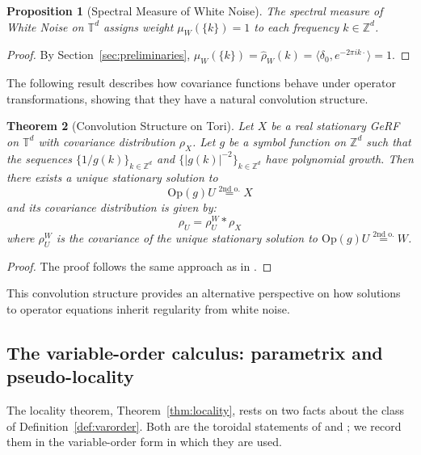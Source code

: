 \documentclass[pdflatex,sn-mathphys,Numbered]{sn-jnl}
\theoremstyle{thmstyleone}%
\newtheorem{theorem}{Theorem}[section]%
\newtheorem{proposition}[theorem]{Proposition}%
\theoremstyle{thmstyletwo}%
\theoremstyle{thmstylethree}%
\newcommand{\ZZ}{\mathbb{Z}}
\newcommand{\TT}{\mathbb{T}}
\newcommand{\Op}{\mathrm{Op}}
\newcommand{\eqso}{\stackrel{\text{2nd o.}}{=}}
\begin{document}
\begin{appendices}
\begin{proposition}[Spectral Measure of White Noise]\label{prop:wn-spectral}
The spectral measure of White Noise on $\TT^d$ assigns weight
$\mu_W(\{k\}) = 1$ to each frequency $k \in \ZZ^d$.
\end{proposition}

\begin{proof}
By Section~\ref{sec:preliminaries}, $\mu_W(\{k\}) = \hat\rho_W(k)
= \langle \delta_0, e^{-2\pi i k\cdot}\rangle = 1$.
\end{proof}

The following result describes how covariance functions behave under operator transformations, showing that they have a natural convolution structure.

\begin{theorem}[Convolution Structure on Tori]
Let $X$ be a real stationary GeRF on $\TT^d$ with covariance distribution $\rho_X$. Let $g$ be a symbol function on $\ZZ^d$ such that the sequences $\{1/g(k)\}_{k \in \ZZ^d}$ and $\{|g(k)|^{-2}\}_{k \in \ZZ^d}$ have polynomial growth. Then there exists a unique stationary solution to
$$\Op(g) U \eqso X$$
and its covariance distribution is given by:
$$\rho_U = \rho_U^W * \rho_X$$
where $\rho_U^W$ is the covariance of the unique stationary solution to $\Op(g) U \eqso W$.
\end{theorem}

\begin{proof}
The proof follows the same approach as in \cite{gerfs}.
\end{proof}

This convolution structure provides an alternative perspective on how solutions to operator equations inherit regularity from white noise.

\subsection{The variable-order calculus: parametrix and pseudo-locality}
\label{subsec:parametrix}

The locality theorem, Theorem~\ref{thm:locality}, rests on two facts about the
class of Definition~\ref{def:varorder}. Both are the toroidal statements of
\cite{ruzhansky,ruzhansky-book} and \cite{duvan1}; we record them in the
variable-order form in which they are used.


\end{appendices}
\end{document}
